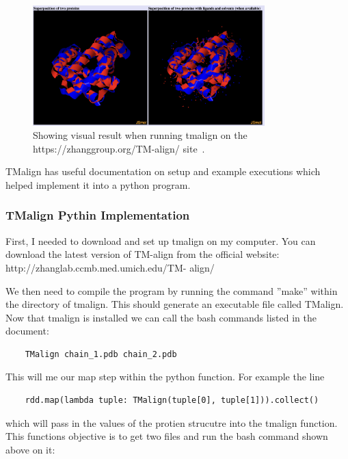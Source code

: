 \documentclass[]{final_report}
\begin{document}
\clearpage

\begin{figure}[ht]
    \centering
    \includegraphics[width=0.8\textwidth]{TmalignVisual.png}
    \caption{\label{fig:TmalignVisual}Showing visual result when running tmalign on the https://zhanggroup.org/TM-align/ site~\cite{zhang_tm-align_nodate}.}
\end{figure}

TMalign has useful documentation on setup and example executions which helped implement it into a python program.

\subsubsection{TMalign Pythin Implementation}

First, I needed to download and set up tmalign on my computer. You can download the latest version of TM-align from the official website: http://zhanglab.ccmb.med.umich.edu/TM- align/

We then need to compile the program by running the command ”make” within the directory of tmalign. This should generate an executable file called TMalign. Now that tmalign is installed we can call the bash commands listed in the document:

\begin{lstlisting}
    TMalign chain_1.pdb chain_2.pdb
\end{lstlisting}

This will me our map step within the python function. For example the line

\begin{lstlisting}
    rdd.map(lambda tuple: TMalign(tuple[0], tuple[1])).collect()
\end{lstlisting}

which will pass in the values of the protien strucutre into the tmalign function. This functions objective is to get two files and run the bash command shown above on it:
\end{document}
